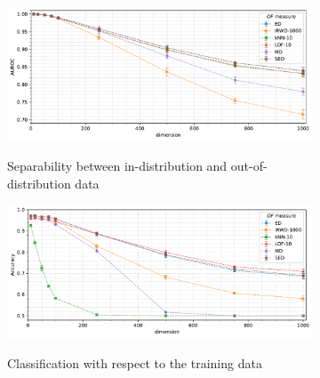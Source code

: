 \begin{figure}[t]
    \centering
    \begin{subfigure}[b]{0.9\textwidth}
        \centering
        \caption{\small Separability between in-distribution and out-of-distribution data}
        \includegraphics[width=\textwidth]{images/distributions/trends-d/trend-distributions-auroc(dimension)-samples_2500-distance_8-distribution_gaussian-model_ED,IRWD-1000,kNN-10,LOF-10,MD,SED-aggregated.pdf}
        \label{fig:dimension-auroc}
    \end{subfigure}
    \begin{subfigure}[b]{0.9\textwidth}
        \centering
        \caption{\small Classification with respect to the training data}
        \includegraphics[width=\textwidth]{images/distributions/trends-d/trend-distributions-accuracy_95(dimension)-samples_2500-distance_8-distribution_gaussian-model_ED,IRWD-1000,kNN-10,LOF-10,MD,SED-aggregated.pdf}
        \label{fig:dimension-accuracy}
    \end{subfigure}
    \begin{subfigure}[b]{0.495\textwidth}

\end{subfigure}
\end{figure}
